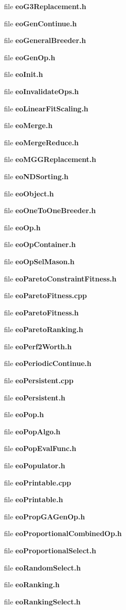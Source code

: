 \begin{CompactItemize}
file {\bf eoG3Replacement.h}
\item 
file {\bf eoGenContinue.h}
\item 
file {\bf eoGeneralBreeder.h}
\item 
file {\bf eoGenOp.h}
\item 
file {\bf eoInit.h}
\item 
file {\bf eoInvalidateOps.h}
\item 
file {\bf eoLinearFitScaling.h}
\item 
file {\bf eoMerge.h}
\item 
file {\bf eoMergeReduce.h}
\item 
file {\bf eoMGGReplacement.h}
\item 
file {\bf eoNDSorting.h}
\item 
file {\bf eoObject.h}
\item 
file {\bf eoOneToOneBreeder.h}
\item 
file {\bf eoOp.h}
\item 
file {\bf eoOpContainer.h}
\item 
file {\bf eoOpSelMason.h}
\item 
file {\bf eoParetoConstraintFitness.h}
\item 
file {\bf eoParetoFitness.cpp}
\item 
file {\bf eoParetoFitness.h}
\item 
file {\bf eoParetoRanking.h}
\item 
file {\bf eoPerf2Worth.h}
\item 
file {\bf eoPeriodicContinue.h}
\item 
file {\bf eoPersistent.cpp}
\item 
file {\bf eoPersistent.h}
\item 
file {\bf eoPop.h}
\item 
file {\bf eoPopAlgo.h}
\item 
file {\bf eoPopEvalFunc.h}
\item 
file {\bf eoPopulator.h}
\item 
file {\bf eoPrintable.cpp}
\item 
file {\bf eoPrintable.h}
\item 
file {\bf eoPropGAGenOp.h}
\item 
file {\bf eoProportionalCombinedOp.h}
\item 
file {\bf eoProportionalSelect.h}
\item 
file {\bf eoRandomSelect.h}
\item 
file {\bf eoRanking.h}
\item 
file {\bf eoRankingSelect.h}

\end{CompactItemize}
